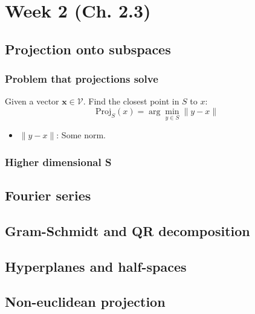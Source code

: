 \documentclass{article}
\begin{document}
\section{Week 2 (Ch. 2.3)}
    \subsection{Projection onto subspaces}
    
    \subsubsection{Problem that projections solve}
        \begin{definition}
            Given a vector $\mathbf{x}\in \mathcal{V}$. Find the closest point in $S$ to $x$: 
            \begin{equation}
                \text{Proj}_S(x) = \arg\min_{y \in S} \| y - x \|
            \end{equation}
            \begin{itemize}
                \item $\| y - x \|$: Some norm.
            \end{itemize}
        \end{definition}

    \subsubsection{Higher dimensional S} %
    \begin{definition}
    \end{definition}

    \subsection{Fourier series}
    
    \subsection{Gram-Schmidt and QR decomposition}
    \subsection{Hyperplanes and half-spaces}
    \subsection{Non-euclidean projection}
\end{document}
